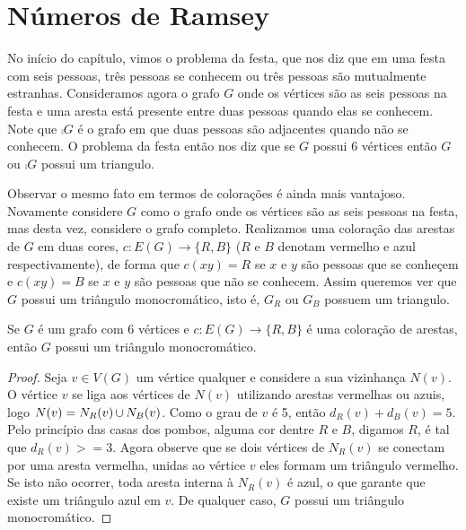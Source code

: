 
\section{Números de Ramsey}

No início do capítulo, vimos o problema da festa, que nos diz que em uma festa com seis pessoas, três pessoas se conhecem ou três pessoas são mutualmente estranhas. Consideramos agora o grafo $G$ onde os vértices são as seis pessoas na festa e uma aresta está presente entre duas pessoas quando elas se conhecem. Note que $\comp{G}$ é o grafo em que duas pessoas são adjacentes quando não se conhecem. O problema da festa então nos diz que se $G$ possui 6 vértices então $G$ ou $\comp{G}$ possui um triangulo.

Observar o mesmo fato em termos de colorações é ainda mais vantajoso. Novamente considere $G$ como o grafo onde os vértices são as seis pessoas na festa, mas desta vez, considere o grafo completo. Realizamos uma coloração das arestas de $G$ em duas cores, $c: E(G) \to \{ R,B \}$ ($R$ e $B$ denotam vermelho e azul respectivamente), de forma que $c(xy) = R$ se $x$ e $y$ são pessoas que se conheçem e $c(xy) = B$ se $x$ e $y$ são pessoas que não se conhecem. Assim queremos ver que $G$ possui um triângulo monocromático, isto é, $G_R$ ou $G_B$ possuem um triangulo.

\begin{theorem}
Se $G$ é um grafo com 6 vértices e $c: E(G) \to \{ R,B\}$ é uma coloração de arestas, então $G$ possui um triângulo monocromático.
\end{theorem}
\begin{proof}
Seja $v \in V(G)$ um vértice qualquer e considere a sua vizinhança $N(v)$. O vértice $v$ se liga aos vértices de $N(v)$ utilizando arestas vermelhas ou azuis, logo $N(v) = N_R(v) \operatorname{\cup} N_B(v)$. Como o grau de $v$ é 5, então $d_R(v) + d_B(v) = 5$. Pelo princípio das casas dos pombos, alguma cor dentre $R$ e $B$, digamos $R$, é tal que $d_R(v) >= 3$. Agora observe que se dois vértices de $N_R(v)$ se conectam por uma aresta vermelha, unidas ao vértice $v$ eles formam um triângulo vermelho. Se isto não ocorrer, toda aresta interna à $N_R(v)$ é azul, o que garante que existe um triângulo azul em $v$. De qualquer caso, $G$ possui um triângulo monocromático.

\end{proof}

